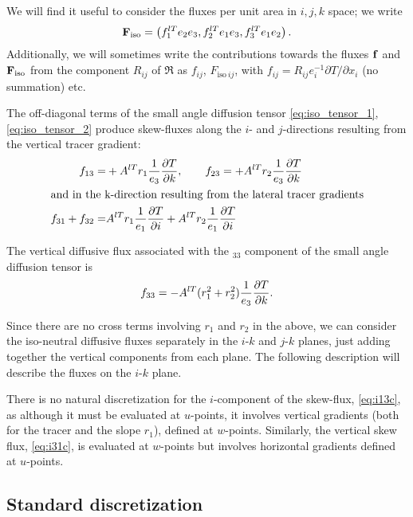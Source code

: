 \documentclass[../main/NEMO_manual]{subfiles}
\begin{document}
We will find it useful to consider the fluxes per unit area in $i,j,k$ space; we write
\[
  \mathbf{F}_{\mathrm{iso}}=\left(f_1^{lT}e_2e_3, f_2^{lT}e_1e_3, f_3^{lT}e_1e_2\right).
\]
Additionally, we will sometimes write the contributions towards the fluxes $\mathbf{f}$ and
$\mathbf{F}_{\mathrm{iso}}$ from the component $R_{ij}$ of $\Re$ as $f_{ij}$, $F_{\mathrm{iso}\: ij}$,
with $f_{ij}=R_{ij}e_i^{-1}\partial T/\partial x_i$ (no summation) etc.

The off-diagonal terms of the small angle diffusion tensor
\autoref{eq:iso_tensor_1}, \autoref{eq:iso_tensor_2} produce skew-fluxes along
the $i$- and $j$-directions resulting from the vertical tracer gradient:
\begin{align}
  \label{eq:i13c}
  f_{13}=&+{A^{lT}} r_1\frac{1}{e_3}\frac{\partial T}{\partial k},\qquad f_{23}=+{A^{lT}} r_2\frac{1}{e_3}\frac{\partial T}{\partial k}\\
  \intertext{and in the k-direction resulting from the lateral tracer gradients}
  \label{eq:i31c}
  f_{31}+f_{32}=& {A^{lT}} r_1\frac{1}{e_1}\frac{\partial T}{\partial i}+{A^{lT}} r_2\frac{1}{e_1}\frac{\partial T}{\partial i}
\end{align}

The vertical diffusive flux associated with the $_{33}$ component of the small angle diffusion tensor is
\begin{equation}
  \label{eq:i33c}
  f_{33}=-{A^{lT}}(r_1^2 +r_2^2) \frac{1}{e_3}\frac{\partial T}{\partial k}.
\end{equation}

Since there are no cross terms involving $r_1$ and $r_2$ in the above,
we can consider the iso-neutral diffusive fluxes separately in the $i$-$k$ and $j$-$k$ planes,
just adding together the vertical components from each plane.
The following description will describe the fluxes on the $i$-$k$ plane.

There is no natural discretization for the $i$-component of the skew-flux, \autoref{eq:i13c},
as although it must be evaluated at $u$-points,
it involves vertical gradients (both for the tracer and the slope $r_1$), defined at $w$-points.
Similarly, the vertical skew flux, \autoref{eq:i31c},
is evaluated at $w$-points but involves horizontal gradients defined at $u$-points.

\subsection{Standard discretization}
\end{document}
